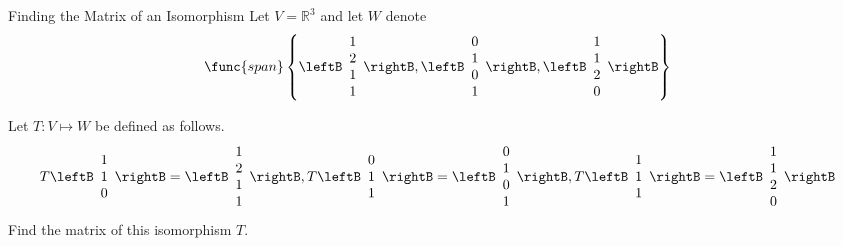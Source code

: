 \begin{example}{Finding the Matrix of an Isomorphism}\label{exa:matrixofisomorphism}
Let $V=\mathbb{R}^{3}$ and let $W$ denote 
\begin{equation*}
\func{span}\left\{ \leftB 
\begin{array}{c}
1 \\ 
2 \\ 
1 \\ 
1
\end{array}
\rightB ,\leftB 
\begin{array}{c}
0 \\ 
1 \\ 
0 \\ 
1
\end{array}
\rightB ,\leftB 
\begin{array}{c}
1 \\ 
1 \\ 
2 \\ 
0
\end{array}
\rightB \right\}
\end{equation*}

Let $T: V \mapsto W$ be defined as follows. 
\begin{equation*}
T\leftB 
\begin{array}{c}
1 \\ 
1 \\ 
0
\end{array}
\rightB =\leftB 
\begin{array}{c}
1 \\ 
2 \\ 
1 \\ 
1
\end{array}
\rightB ,T\leftB 
\begin{array}{c}
0 \\ 
1 \\ 
1
\end{array}
\rightB =\leftB 
\begin{array}{c}
0 \\ 
1 \\ 
0 \\ 
1
\end{array}
\rightB ,T\leftB 
\begin{array}{c}
1 \\ 
1 \\ 
1
\end{array}
\rightB =\leftB 
\begin{array}{c}
1 \\ 
1 \\ 
2 \\ 
0
\end{array}
\rightB
\end{equation*}
Find the matrix of this isomorphism $T$.
\end{example}

